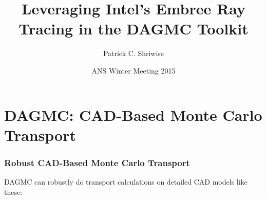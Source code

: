 \documentclass[12pt]{beamer}
\title{Leveraging Intel's Embree Ray Tracing in the DAGMC Toolkit}
\author{Patrick C. Shriwise}
\institute{University of Wisconsin - Madison}
\date{ANS Winter Meeting 2015}
\begin{document}
\frame{\titlepage \addtocounter{framenumber}{-1}}



\section{DAGMC: CAD-Based Monte Carlo Transport} %
\begin{frame}

\frametitle{Robust CAD-Based Monte Carlo Transport}

DAGMC can robustly do transport calculations on detailed CAD models like these:


\begin{center}
\begin{tabular}{c c}


\end{tabular}
\end{center}
\end{frame}
\end{document}
